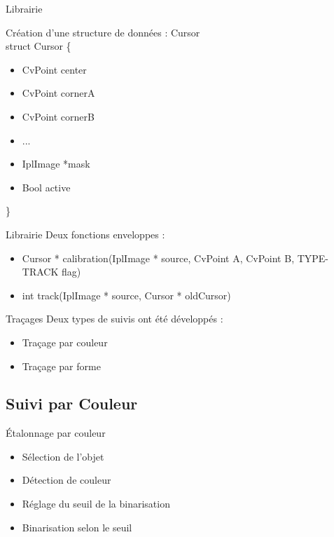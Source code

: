 \documentclass{beamer}
\begin{document}
		\begin{frame}{Librairie}

		Création d'une structure de données : Cursor\\
		struct Cursor \{
		\begin{itemize}
			\item{CvPoint center}
			\item{CvPoint cornerA}
			\item{CvPoint cornerB}
			\item{...}
			\item{IplImage *mask}
			\item{Bool active}
		\end{itemize}
		\} \\
		\end{frame}
		
		\begin{frame}{Librairie}
		Deux fonctions enveloppes : \\
			\begin{itemize}
				\item{Cursor * calibration(IplImage * source, CvPoint A, CvPoint B, TYPE-TRACK flag)}
				\item{int track(IplImage * source, Cursor * oldCursor)}
			\end{itemize}		
		\end{frame}

		\begin{frame}{Traçages}
		Deux types de suivis ont été développés : \\
			\begin{itemize}
				\item{Traçage par couleur}
				\item{Traçage par forme}
			\end{itemize}
		\end{frame}

		\subsection{Suivi par Couleur}
		\begin{frame}{Étalonnage par couleur}
			\begin{itemize}
				\item{Sélection de l'objet}
				\item{Détection de couleur}
				\item{Réglage du seuil de la binarisation}
				\item{Binarisation selon le seuil}
			\end{itemize}
		\end{frame}
\end{document}
